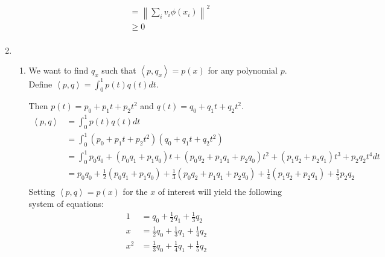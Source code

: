 \documentclass[12pt]{article}
\newcommand{\norm}[1]{\left\lVert#1\right\rVert}
\newcommand{\parens}[1]{\left(#1\right)}
\newcommand{\chev}[1]{\left<#1\right>}
\begin{document}
\begin{enumerate}
\begin{enumerate}
\begin{equation}
\begin{split}
                        &=\norm{\sum_{i}v_i\phi\parens{x_i}}^2\\
                        &\geq0\\
                    \end{split}
                \end{equation}
        \end{enumerate}
    \item
        \begin{enumerate}
            \item
                We want to find $q_x$ such that $\chev{p, q_x}=p(x)$ for any polynomial $p$.
                Define $\chev{p,q}=\int_0^1p(t)q(t)dt$.

                Then $p(t)=p_0+p_1t+p_2t^2$ and $q(t)=q_0+q_1t+q_2t^2$.
                \begin{equation}
                    \begin{split}
                        \chev{p,q}&=\int_0^1p(t)q(t)dt\\
                        &=\int_0^1\parens{p_0+p_1t+p_2t^2}\parens{q_0+q_1t+q_2t^2}\\
                        &=\int_0^1p_0q_0+\parens{p_0q_1+p_1q_0}t
                            +\parens{p_0q_2+p_1q_1+p_2q_0}t^2+\parens{p_1q_2+p_2q_1}t^3
                            +p_2q_2t^4dt\\
                        &=p_0q_0+\frac{1}{2}\parens{p_0q_1+p_1q_0}+
                            \frac{1}{3}\parens{p_0q_2+p_1q_1+p_2q_0}+
                            \frac{1}{4}\parens{p_1q_2+p_2q_1}+\frac{1}{5}p_2q_2\\
                    \end{split}
                \end{equation}
                Setting $\chev{p,q}=p(x)$ for the $x$ of interest will yield the
                following system of equations:
                \begin{equation}
                    \begin{split}
                        1&=q_0+\frac{1}{2}q_1+\frac{1}{3}q_2\\
                        x&=\frac{1}{2}q_0+\frac{1}{3}q_1+\frac{1}{4}q_2\\
                        x^2&=\frac{1}{3}q_0+\frac{1}{4}q_1+\frac{1}{5}q_2\\
                    \end{split}
                \end{equation}


\end{enumerate}
\end{enumerate}
\end{document}
